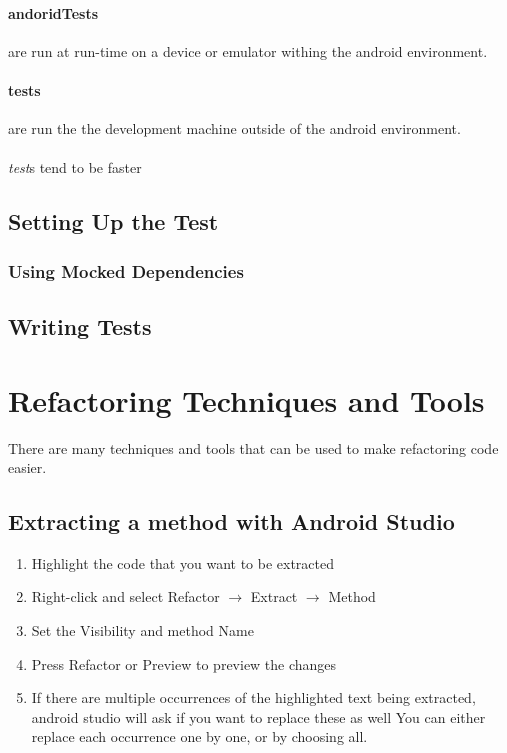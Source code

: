 \documentclass[]{article}
\begin{document}
\paragraph{andoridTests} are run at run-time on a device or emulator withing the android environment.
\paragraph{tests} are run the the development machine outside of the android environment.
\\\\
\textit{test}s tend to be faster

\subsection{Setting Up the Test}

\subsubsection{Using Mocked Dependencies}

\subsection{Writing Tests}

\section{Refactoring Techniques and Tools}
There are many techniques and tools that can be used to make refactoring code easier.
\subsection{Extracting a method with Android Studio}
\begin{enumerate}
	\item  Highlight the code that you want to be extracted
	\item Right-click and select Refactor $\rightarrow$ Extract $\rightarrow$ Method
	\item Set the Visibility and method Name 
	\item Press Refactor or Preview to preview the changes
	\item If there are multiple occurrences of the highlighted text being extracted, android studio will ask if you want to replace these as well 
	\subitem You can either replace each occurrence one by one, or by choosing all.
\end{enumerate}
\end{document}
